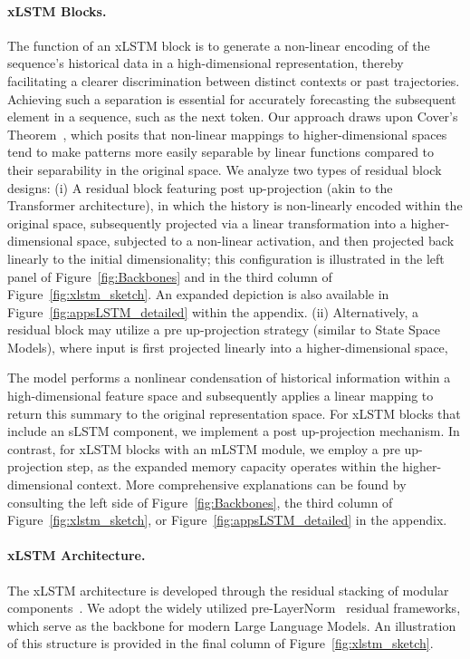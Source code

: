 \paragraph{xLSTM Blocks.}
\label{sec:xLSTMblock}
The function of an xLSTM block is to generate a non-linear encoding of the sequence's historical data in a high-dimensional representation, thereby facilitating a clearer discrimination between distinct contexts or past trajectories. Achieving such a separation is essential for accurately forecasting the subsequent element in a sequence, such as the next token. Our approach draws upon Cover’s Theorem~\citep{Cover:65}, which posits that non-linear mappings to higher-dimensional spaces tend to make patterns more easily separable by linear functions compared to their separability in the original space. We analyze two types of residual block designs: (i) A residual block featuring post up-projection (akin to the Transformer architecture), in which the history is non-linearly encoded within the original space, subsequently projected via a linear transformation into a higher-dimensional space, subjected to a non-linear activation, and then projected back linearly to the initial dimensionality; this configuration is illustrated in the left panel of Figure~\ref{fig:Backbones} and in the third column of Figure~\ref{fig:xlstm_sketch}. An expanded depiction is also available in Figure~\ref{fig:appsLSTM_detailed} within the appendix. (ii) Alternatively, a residual block may utilize a pre up-projection strategy (similar to State Space Models), where input is first projected linearly into a higher-dimensional space,

The model performs a nonlinear condensation of historical information within a high-dimensional feature space and subsequently applies a linear mapping to return this summary to the original representation space. For xLSTM blocks that include an sLSTM component, we implement a post up-projection mechanism. In contrast, for xLSTM blocks with an mLSTM module, we employ a pre up-projection step, as the expanded memory capacity operates within the higher-dimensional context. More comprehensive explanations can be found by consulting the left side of Figure~\ref{fig:Backbones}, the third column of Figure~\ref{fig:xlstm_sketch}, or Figure~\ref{fig:appsLSTM_detailed} in the appendix.

\paragraph{xLSTM Architecture. }
\label{sec:xLSTMarchitecure}
The xLSTM architecture is developed through the residual stacking of modular components~\citep{Srivastava:15,He:16}. We adopt the widely utilized pre-LayerNorm~\citep{Ba:16b} residual frameworks, which serve as the backbone for modern Large Language Models. An illustration of this structure is provided in the final column of Figure~\ref{fig:xlstm_sketch}.

